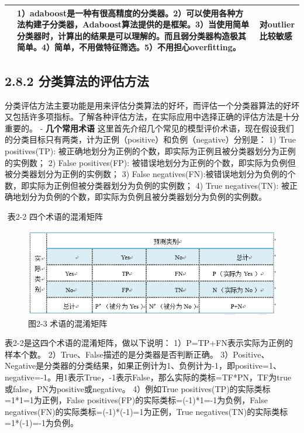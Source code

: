 \begin{longtable}[]{lll}
\begin{minipage}[t]{0.04\columnwidth}
\end{minipage} & \begin{minipage}[t]{0.04\columnwidth}\raggedright\strut
1）adaboost是一种有很高精度的分类器。2）可以使用各种方法构建子分类器，Adaboost算法提供的是框架。3）当使用简单分类器时，计算出的结果是可以理解的。而且弱分类器构造极其简单。4）简单，不用做特征筛选。5）不用担心overfitting。\strut
\end{minipage} & \begin{minipage}[t]{0.04\columnwidth}\raggedright\strut
对outlier比较敏感\strut
\end{minipage}\tabularnewline
 \bottomrule
\end{longtable}

\subsection{2.8.2
分类算法的评估方法}\label{ux5206ux7c7bux7b97ux6cd5ux7684ux8bc4ux4f30ux65b9ux6cd5}

​
分类评估方法主要功能是用来评估分类算法的好坏，而评估一个分类器算法的好坏又包括许多项指标。了解各种评估方法，在实际应用中选择正确的评估方法是十分重要的。
- \textbf{几个常用术语} ​
这里首先介绍几个常见的模型评价术语，现在假设我们的分类目标只有两类，计为正例（positive）和负例（negative）分别是：
1) True positives(TP):
被正确地划分为正例的个数，即实际为正例且被分类器划分为正例的实例数； 2)
False positives(FP):
被错误地划分为正例的个数，即实际为负例但被分类器划分为正例的实例数； 3)
False
negatives(FN):被错误地划分为负例的个数，即实际为正例但被分类器划分为负例的实例数；
4) True negatives(TN):
被正确地划分为负例的个数，即实际为负例且被分类器划分为负例的实例数。　

​ 表2-2 四个术语的混淆矩阵

\begin{figure}
\centering
\includegraphics{./img/ch2/2.9/1.png}
\caption{图2-3 术语的混淆矩阵}
\end{figure}

表2-2是这四个术语的混淆矩阵，做以下说明：
1）P=TP+FN表示实际为正例的样本个数。
2）True、False描述的是分类器是否判断正确。
3）Positive、Negative是分类器的分类结果，如果正例计为1、负例计为-1，即positive=1、negative=-1。用1表示True，-1表示False，那么实际的类标=TF*PN，TF为true或false，PN为positive或negative。
4）例如True positives(TP)的实际类标=1*1=1为正例，False
positives(FP)的实际类标=(-1)*1=-1为负例，False
negatives(FN)的实际类标=(-1)*(-1)=1为正例，True
negatives(TN)的实际类标=1*(-1)=-1为负例。

